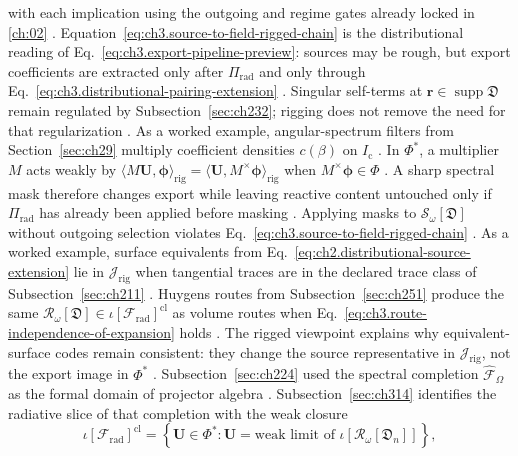 with each implication using the outgoing and regime gates already locked in \ref{ch:02}
\cite{stratton1941}. Equation~\eqref{eq:ch3.source-to-field-rigged-chain} is the
distributional reading of Eq.~\eqref{eq:ch3.export-pipeline-preview}: sources may be rough, but export
coefficients are extracted only after \(\Pi_{\mathrm{rad}}\) and only through
Eq.~\eqref{eq:ch3.distributional-pairing-extension} \cite{stratton1941}. Singular self-terms at
\(\mathbf{r}\in\operatorname{supp}\mathfrak{D}\) remain regulated by Subsection~\ref{sec:ch232}; rigging
does not remove the need for that regularization \cite{harrington2001}.
As a worked example, angular-spectrum filters from Section~\ref{sec:ch29} multiply coefficient densities \(c(\beta)\) on
\(I_{\mathrm{c}}\) \cite{jackson1999}. In \(\Phi^{*}\), a multiplier \(M\) acts weakly by
\(\langle M\mathbf{U},\boldsymbol{\phi}\rangle_{\mathrm{rig}}=\langle\mathbf{U},M^{\times}\boldsymbol{\phi}\rangle_{\mathrm{rig}}\)
when \(M^{\times}\boldsymbol{\phi}\in\Phi\) \cite{kato1995}. A sharp spectral mask therefore
changes export while leaving reactive content untouched only if \(\Pi_{\mathrm{rad}}\) has already been
applied before masking \cite{stratton1941}. Applying masks to \(\mathcal{S}_\omega[\mathfrak{D}]\) without
outgoing selection violates Eq.~\eqref{eq:ch3.source-to-field-rigged-chain} \cite{harrington2001}.
As a worked example, surface equivalents from Eq.~\eqref{eq:ch2.distributional-source-extension} lie in \(\mathcal{J}_{\mathrm{rig}}\)
when tangential traces are in the declared trace class of Subsection~\ref{sec:ch211}
\cite{stratton1941}. Huygens routes from Subsection~\ref{sec:ch251} produce the same
\(\mathcal{R}_\omega[\mathfrak{D}]\in\iota[\mathcal{F}_{\mathrm{rad}}]^{\mathrm{cl}}\) as volume routes when
Eq.~\eqref{eq:ch3.route-independence-of-expansion} holds \cite{stratton1941}. The rigged viewpoint explains
why equivalent-surface codes remain consistent: they change the source representative in \(\mathcal{J}_{\mathrm{rig}}\),
not the export image in \(\Phi^{*}\) \cite{harrington2001}.
Subsection~\ref{sec:ch224} used the spectral completion \(\widehat{\mathcal{F}}_\Omega\) as the formal domain of
projector algebra \cite{stratton1941}. Subsection~\ref{sec:ch314} identifies the radiative slice of that completion
with the weak closure
\begin{equation}
\label{eq:ch3.spectral-completion-radiative}
\iota[\mathcal{F}_{\mathrm{rad}}]^{\mathrm{cl}}
=
\left\{
\mathbf{U}\in\Phi^{*}:
\mathbf{U}=\text{weak limit of }\iota[\mathcal{R}_\omega[\mathfrak{D}_n]]
\right\},
\end{equation}
